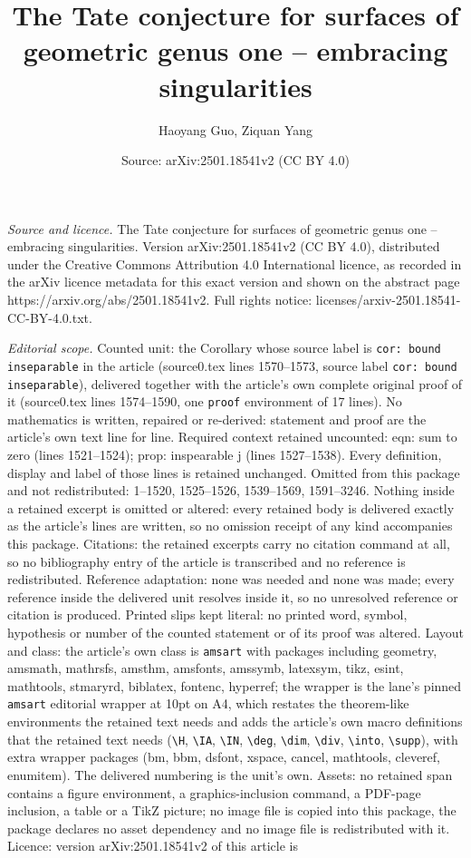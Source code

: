 \documentclass[10pt,a4paper]{amsart}
\title[The Tate conjecture for surfaces of geometric genus one -- e]{The Tate conjecture for surfaces of geometric genus one -- embracing singularities}
\author{Haoyang Guo, Ziquan Yang}
\date{Source: arXiv:2501.18541v2 (CC BY 4.0)}
\begin{document}
\maketitle

\noindent\emph{Source and licence.} The Tate conjecture for surfaces of geometric genus one -- embracing singularities. Version arXiv:2501.18541v2 (CC BY 4.0), distributed under the Creative Commons Attribution 4.0 International licence, as recorded in the arXiv licence metadata for this exact version and shown on the abstract page https://arxiv.org/abs/2501.18541v2. Full rights notice: licenses/arxiv-2501.18541-CC-BY-4.0.txt.\par\smallskip

\noindent\textit{Editorial scope.} Counted unit: the Corollary whose source label is \texttt{cor: bound inseparable} in the article (source0.tex lines 1570--1573, source label \texttt{cor: bound inseparable}), delivered together with the article's own complete original proof of it (source0.tex lines 1574--1590, one \texttt{proof} environment of 17 lines). No mathematics is written, repaired or re-derived: statement and proof are the article's own text line for line. Required context retained uncounted: eqn: sum to zero (lines 1521--1524); prop: inspearable j (lines 1527--1538). Every definition, display and label of those lines is retained unchanged. Omitted from this package and not redistributed: 1--1520, 1525--1526, 1539--1569, 1591--3246. Nothing inside a retained excerpt is omitted or altered: every retained body is delivered exactly as the article's lines are written, so no omission receipt of any kind accompanies this package. Citations: the retained excerpts carry no citation command at all, so no bibliography entry of the article is transcribed and no reference is redistributed. Reference adaptation: none was needed and none was made; every reference inside the delivered unit resolves inside it, so no unresolved reference or citation is produced. Printed slips kept literal: no printed word, symbol, hypothesis or number of the counted statement or of its proof was altered. Layout and class: the article's own class is \texttt{amsart} with packages including geometry, amsmath, mathrsfs, amsthm, amsfonts, amssymb, latexsym, tikz, esint, mathtools, stmaryrd, biblatex, fontenc, hyperref; the wrapper is the lane's pinned \texttt{amsart} editorial wrapper at 10pt on A4, which restates the theorem-like environments the retained text needs and adds the article's own macro definitions that the retained text needs (\texttt{\textbackslash H}, \texttt{\textbackslash IA}, \texttt{\textbackslash IN}, \texttt{\textbackslash deg}, \texttt{\textbackslash dim}, \texttt{\textbackslash div}, \texttt{\textbackslash into}, \texttt{\textbackslash supp}), with extra wrapper packages (bm, bbm, dsfont, xspace, cancel, mathtools, cleveref, enumitem). The delivered numbering is the unit's own. Assets: no retained span contains a figure environment, a graphics-inclusion command, a PDF-page inclusion, a table or a TikZ picture; no image file is copied into this package, the package declares no asset dependency and no image file is redistributed with it. Licence: version arXiv:2501.18541v2 of this article is 
\end{document}
